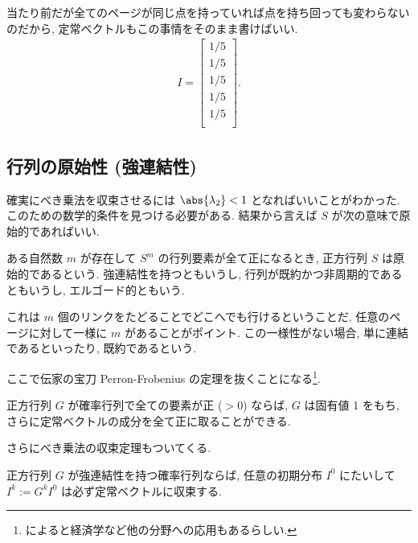 \documentclass[openany, a4paper, oneside]{jsbook}
\begin{document}
当たり前だが全てのページが同じ点を持っていれば点を持ち回っても変わらないのだから,
定常ベクトルもこの事情をそのまま書けばいい.
\begin{align}
 I
 =
 \begin{bmatrix}
  1/5\\
  1/5\\
  1/5\\
  1/5\\
  1/5\\
 \end{bmatrix}
 .
\end{align}
\subsection{行列の原始性 (強連結性)}

確実にべき乗法を収束させるには $\abs{\lambda_2} < 1$ となればいいことがわかった.
このための数学的条件を見つける必要がある.
結果から言えば $S$ が次の意味で原始的であればいい.
\begin{defn}
ある自然数 $m$ が存在して $S^m$ の行列要素が全て正になるとき,
正方行列 $S$ は原始的であるという.
強連結性を持つともいうし,
行列が既約かつ非周期的であるともいうし,
エルゴード的ともいう.
\end{defn}
\begin{rem}
これは $m$ 個のリンクをたどることでどこへでも行けるということだ.
任意のページに対して一様に $m$ があることがポイント.
この一様性がない場合, 単に連結であるといったり,
既約であるという.
\end{rem}
ここで伝家の宝刀 Perron-Frobenius の定理を抜くことになる\footnote{\cite{MasahikoSaitoh1} によると経済学など他の分野への応用もあるらしい.}.
\begin{thm}\label{linear-algebra-google-pagerank22}
正方行列 $G$ が確率行列で全ての要素が正 ($>0$) ならば,
$G$ は固有値 1 をもち, さらに定常ベクトルの成分を全て正に取ることができる.
\end{thm}
さらにべき乗法の収束定理もついてくる.
\begin{thm}[離散時間マルコフ連鎖の収束定理]\label{linear-algebra-google-pagerank23}
正方行列 $G$ が強連結性を持つ確率行列ならば, 任意の初期分布 $I^0$ にたいして
$I^k := G^k I^0$ は必ず定常ベクトルに収束する.
\end{thm}
\end{document}
